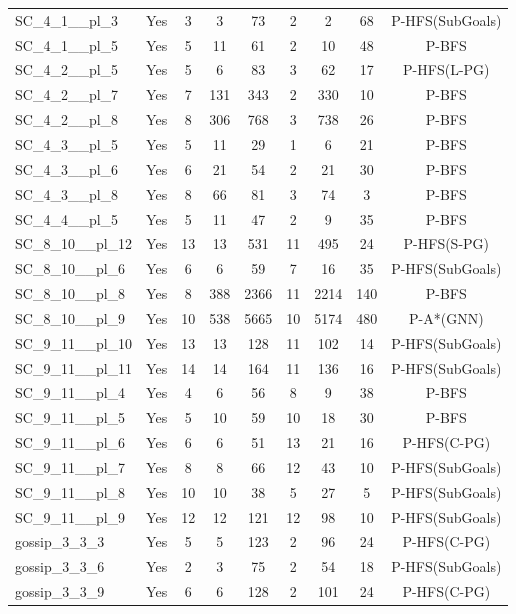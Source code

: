 \documentclass{article}
\begin{document}
\begin{tabular}{lcccccccc}
SC\_4\_1\_\_pl\_3 & Yes & 3 & 3 & 73 & 2 & 2 & 68 & P-HFS(SubGoals) \\
SC\_4\_1\_\_pl\_5 & Yes & 5 & 11 & 61 & 2 & 10 & 48 & P-BFS \\
SC\_4\_2\_\_pl\_5 & Yes & 5 & 6 & 83 & 3 & 62 & 17 & P-HFS(L-PG) \\
SC\_4\_2\_\_pl\_7 & Yes & 7 & 131 & 343 & 2 & 330 & 10 & P-BFS \\
SC\_4\_2\_\_pl\_8 & Yes & 8 & 306 & 768 & 3 & 738 & 26 & P-BFS \\
SC\_4\_3\_\_pl\_5 & Yes & 5 & 11 & 29 & 1 & 6 & 21 & P-BFS \\
SC\_4\_3\_\_pl\_6 & Yes & 6 & 21 & 54 & 2 & 21 & 30 & P-BFS \\
SC\_4\_3\_\_pl\_8 & Yes & 8 & 66 & 81 & 3 & 74 & 3 & P-BFS \\
SC\_4\_4\_\_pl\_5 & Yes & 5 & 11 & 47 & 2 & 9 & 35 & P-BFS \\
SC\_8\_10\_\_pl\_12 & Yes & 13 & 13 & 531 & 11 & 495 & 24 & P-HFS(S-PG) \\
SC\_8\_10\_\_pl\_6 & Yes & 6 & 6 & 59 & 7 & 16 & 35 & P-HFS(SubGoals) \\
SC\_8\_10\_\_pl\_8 & Yes & 8 & 388 & 2366 & 11 & 2214 & 140 & P-BFS \\
SC\_8\_10\_\_pl\_9 & Yes & 10 & 538 & 5665 & 10 & 5174 & 480 & P-A*(GNN) \\
SC\_9\_11\_\_pl\_10 & Yes & 13 & 13 & 128 & 11 & 102 & 14 & P-HFS(SubGoals) \\
SC\_9\_11\_\_pl\_11 & Yes & 14 & 14 & 164 & 11 & 136 & 16 & P-HFS(SubGoals) \\
SC\_9\_11\_\_pl\_4 & Yes & 4 & 6 & 56 & 8 & 9 & 38 & P-BFS \\
SC\_9\_11\_\_pl\_5 & Yes & 5 & 10 & 59 & 10 & 18 & 30 & P-BFS \\
SC\_9\_11\_\_pl\_6 & Yes & 6 & 6 & 51 & 13 & 21 & 16 & P-HFS(C-PG) \\
SC\_9\_11\_\_pl\_7 & Yes & 8 & 8 & 66 & 12 & 43 & 10 & P-HFS(SubGoals) \\
SC\_9\_11\_\_pl\_8 & Yes & 10 & 10 & 38 & 5 & 27 & 5 & P-HFS(SubGoals) \\
SC\_9\_11\_\_pl\_9 & Yes & 12 & 12 & 121 & 12 & 98 & 10 & P-HFS(SubGoals) \\
gossip\_3\_3\_3 & Yes & 5 & 5 & 123 & 2 & 96 & 24 & P-HFS(C-PG) \\
gossip\_3\_3\_6 & Yes & 2 & 3 & 75 & 2 & 54 & 18 & P-HFS(SubGoals) \\
gossip\_3\_3\_9 & Yes & 6 & 6 & 128 & 2 & 101 & 24 & P-HFS(C-PG) \\

\end{tabular}
\end{document}

